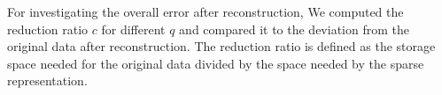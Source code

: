 For investigating the overall error after reconstruction, We computed the
reduction ratio $c$ for different $q$ and compared it to the
deviation from the original data after reconstruction. The reduction ratio is
defined as the storage space needed for the original data divided by the space
needed by the sparse representation.
%
%
%
%
%

